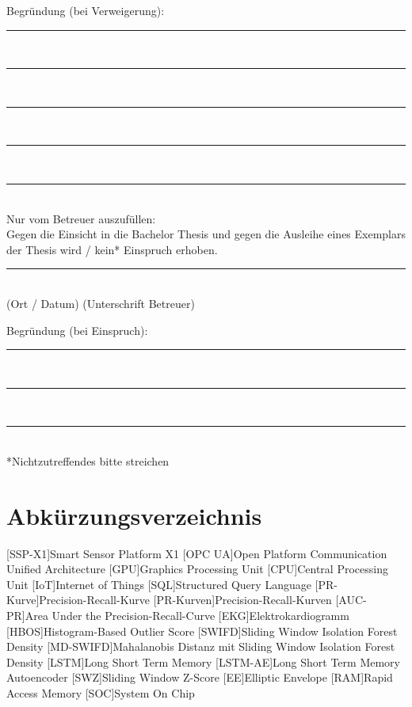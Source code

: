 \par
Begr\"undung (bei Verweigerung): \\[5ex]
\rule[0ex]{\textwidth}{0.4pt} \\[2ex]
\rule[0ex]{\textwidth}{0.4pt} \\[2ex]
\rule[0ex]{\textwidth}{0.4pt} \\[2ex]
\rule[0ex]{\textwidth}{0.4pt} \\[2ex]
\rule[0ex]{\textwidth}{0.4pt} \\[5ex]
Nur vom Betreuer auszuf\"ullen: \\[2ex]
Gegen die Einsicht in die Bachelor Thesis  und gegen die Ausleihe eines Exemplars der Thesis wird / kein* Einspruch 
erhoben.
\par \vspace{10mm}
\rule[0ex]{\textwidth}{0.4pt}\\
(Ort / Datum)\hspace{30ex} (Unterschrift Betreuer)
\par
Begr\"undung (bei Einspruch): \\[5ex]
\rule[0ex]{\textwidth}{0.4pt} \\[2ex]
\rule[0ex]{\textwidth}{0.4pt} \\[2ex]
\rule[0ex]{\textwidth}{0.4pt} \\[5ex]
*Nichtzutreffendes bitte streichen
%
\clearpage
{}
\tableofcontents
\clearpage
\listoffigures
\clearpage
\listoftables
\clearpage
\chapter*{Abkürzungsverzeichnis}
\begin{acronym}
    [SSP-X1]{Smart Sensor Platform X1}
    [OPC UA]{Open Platform Communication Unified Architecture}
    [GPU]{Graphics Processing Unit}
    [CPU]{Central Processing Unit}
    [IoT]{Internet of Things}
    [SQL]{Structured Query Language}
    [PR-Kurve]{Precision-Recall-Kurve}
    [PR-Kurven]{Precision-Recall-Kurven}
    [AUC-PR]{Area Under the Precision-Recall-Curve}
    [EKG]{Elektrokardiogramm}
    [HBOS]{Histogram-Based Outlier Score}
    [SWIFD]{Sliding Window Isolation Forest Density}
    [MD-SWIFD]{Mahalanobis Distanz mit Sliding Window Isolation Forest Density}
    [LSTM]{Long Short Term Memory}
    [LSTM-AE]{Long Short Term Memory Autoencoder}
    [SWZ]{Sliding Window Z-Score}
    [EE]{Elliptic Envelope}
    [RAM]{Rapid Access Memory}
    [SOC]{System On Chip}
\end{acronym}